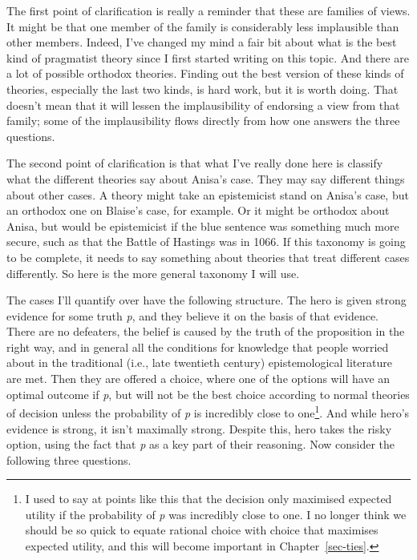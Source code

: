 \documentclass[
  12pt,
  letterpaper,
]{scrbook}
\begin{document}
The first point of clarification is really a reminder that these are
families of views. It might be that one member of the family is
considerably less implausible than other members. Indeed, I've changed
my mind a fair bit about what is the best kind of pragmatist theory
since I first started writing on this topic. And there are a lot of
possible orthodox theories. Finding out the best version of these kinds
of theories, especially the last two kinds, is hard work, but it is
worth doing. That doesn't mean that it will lessen the implausibility of
endorsing a view from that family; some of the implausibility flows
directly from how one answers the three questions.

The second point of clarification is that what I've really done here is
classify what the different theories say about Anisa's case. They may
say different things about other cases. A theory might take an
epistemicist stand on Anisa's case, but an orthodox one on Blaise's
case, for example. Or it might be orthodox about Anisa, but would be
epistemicist if the blue sentence was something much more secure, such
as that the Battle of Hastings was in 1066. If this taxonomy is going to
be complete, it needs to say something about theories that treat
different cases differently. So here is the more general taxonomy I will
use.

The cases I'll quantify over have the following structure. The hero is
given strong evidence for some truth \emph{p}, and they believe it on
the basis of that evidence. There are no defeaters, the belief is caused
by the truth of the proposition in the right way, and in general all the
conditions for knowledge that people worried about in the traditional
(i.e., late twentieth century) epistemological literature are met. Then
they are offered a choice, where one of the options will have an optimal
outcome if \emph{p}, but will not be the best choice according to normal
theories of decision unless the probability of \emph{p} is incredibly
close to one\footnote{I used to say at points like this that the
  decision only maximised expected utility if the probability of
  \emph{p} was incredibly close to one. I no longer think we should be
  so quick to equate rational choice with choice that maximises expected
  utility, and this will become important in Chapter~\ref{sec-ties}.}.
And while hero's evidence is strong, it isn't maximally strong. Despite
this, hero takes the risky option, using the fact that \emph{p} as a key
part of their reasoning. Now consider the following three questions.
\end{document}
